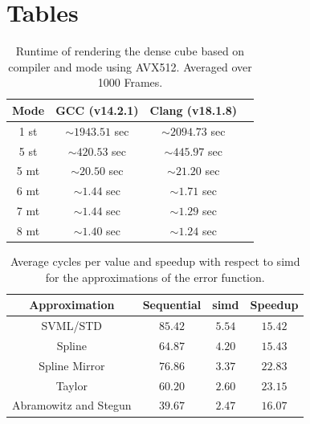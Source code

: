 \documentclass[a4paper, 11pt]{memoir}
\begin{document}
    \chapter{Tables}
    \label{ch:tables}
    \begin{table}[ht]
        \centering
        \begin{tabular}{|c | c | c | c|}
            \hline
            Mode & GCC (v14.2.1)     & Clang (v18.1.8)\\\hline
            1 st & $\sim1943.51$ sec & $\sim2094.73$ sec\\
            5 st & $\sim420.53$ sec  & $\sim445.97$ sec\\
            5 mt & $\sim20.50$ sec   & $\sim21.20$ sec \\
            6 mt & $\sim1.44$ sec    & $\sim1.71$ sec \\
            7 mt & $\sim1.44$ sec    & $\sim1.29$ sec \\
            8 mt & $\sim1.40$ sec    & $\sim1.24$ sec \\
            \hline
        \end{tabular}
        \caption{Runtime of rendering the dense cube based on compiler and mode using AVX512. Averaged over 1000 Frames.}
        \label{tab:perf_dense_cube_avx512}
    \end{table}

    \begin{table}[ht]
        \centering
        \begin{tabular}{|c|c|c|c|}
            \hline
            Approximation & Sequential & \gls{simd} & Speedup\\\hline
            SVML/STD              & $85.42$ & $5.54$ & $15.42$\\
            Spline                & $64.87$ & $4.20$ & $15.43$\\
            Spline Mirror         & $76.86$ & $3.37$ & $22.83$\\
            Taylor                & $60.20$ & $2.60$ & $23.15$\\
            Abramowitz and Stegun & $39.67$ & $2.47$ & $16.07$\\
            \hline
        \end{tabular}
        \caption{Average cycles per value and speedup with respect to \gls{simd} for the approximations of the error function.}
        \label{tab:abs_cycles_and_speedups_erf}
    \end{table}
\end{document}
